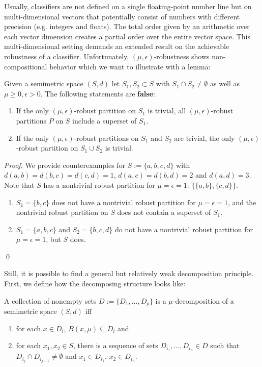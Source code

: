 Usually, classifiers are not defined on a single floating-point number line but on multi-dimensional vectors that potentially consist of numbers with different precision (e.g. integers and floats). The total order given by an arithmetic over each vector dimension creates a partial order over the entire vector space. This multi-dimensional setting demands an extended result on the achievable robustness of a classifier. Unfortunately, $(\mu,\epsilon)$-robustness shows non-compositional behavior which we want to illustrate with a lemma:
\begin{lemma}
\label{lem:noncompositional}
Given a semimetric space $(S, d)$ let $S_1, S_2 \subset S$ with $S_1 \cap S_2 \neq \emptyset$ as well as $\mu \geq 0, \epsilon > 0$. The following statements are \textbf{false}:
\begin{enumerate}
    \item If the only $(\mu, \epsilon)$-robust partition on $S_1$ is trivial, all $(\mu, \epsilon)$-robust partitions $P$ on $S$ include a superset of $S_1$.
    \item If the only $(\mu, \epsilon)$-robust partitions on $S_1$ and $S_2$ are trivial, the only $(\mu, \epsilon)$-robust partition on $S_1 \cup S_2$ is trivial.
\end{enumerate}
\end{lemma}
\begin{proof}
We provide counterexamples for $S := \{a,b,c,d\}$ with $d(a,b) = d(b,c) = d(c,d) = 1$, $d(a,c) = d(b,d) = 2$ and $d(a,d) = 3$. Note that $S$ has a nontrivial robust partition for $\mu = \epsilon = 1$: $\{\{a,b\},\{c,d\}\}$.
\begin{enumerate}
    \item $S_1 = \{b,c\}$ does not have a nontrivial robust partition for $\mu = \epsilon = 1$, and the nontrivial robust partition on $S$ does not contain a superset of $S_1$.
    \item $S_1 = \{a,b,c\}$ and $S_2 = \{b,c,d\}$ do not have a nontrivial robust partition for $\mu = \epsilon = 1$, but $S$ does.
\end{enumerate}
\qed
\end{proof}

Still, it is possible to find a general but relatively weak decomposition principle. First, we define how the decomposing structure looks like:
\begin{definition}[$\mu$-Decomposition]
    \label{def:decomposition}
    A collection of nonempty sets $D := \{D_1,\dots,D_p\}$ is a $\mu$-decomposition of a semimetric space $(S, d)$ iff
    \begin{enumerate}
        \item for each $x \in D_i$, $B(x, \mu) \subseteq D_i$ and
        \item for each $x_1, x_2 \in S$, there is a sequence of sets $D_{i_1},\dots,D_{i_n} \in D$ such that $D_{i_{j}} \cap D_{i_{j+1}} \neq \emptyset$ and $x_1 \in D_{i_1}$, $x_2 \in D_{i_n}$. 
    \end{enumerate} 
\end{definition}

